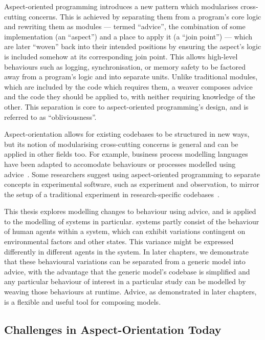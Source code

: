 Aspect-oriented programming introduces a new pattern which modularises
cross-cutting concerns. This is achieved by separating them from a program's
core logic and rewriting them as modules --- termed ``advice'', the combination
of some implementation (an ``aspect'') and a place to apply it (a ``join
point'') --- which are later ``woven'' back into their intended positions by
ensuring the aspect's logic is included somehow at its corresponding join point.
This allows high-level behaviours such as logging, synchronisation, or memory
safety to be factored away from a program's logic and into separate units.
Unlike traditional modules, which are included by the code which requires them,
a weaver composes advice and the code they should be applied to, with neither
requiring knowledge of the other. This separation is core to aspect-oriented
programming's design, and is referred to as ``obliviousness''.

Aspect-orientation allows for existing codebases to be structured in new ways,
but its notion of modularising cross-cutting concerns is general and can be
applied in other fields too. For example, business process modelling languages
have been adapted to accomodate behaviours or processes modelled using
advice~\cite{Cappelli_AOBPM,da2020implementation,charfi2007ao4bpel}. Some
researchers suggest using aspect-oriented programming to separate concepts in
experimental software, such as experiment and observation, to mirror the setup
of a traditional experiment in research-specific codebases~\cite{gulyas1999use}.

This thesis explores modelling changes to behaviour using advice, and is applied
to the modelling of \sociotechnical systems in particular. \Sociotechnical
systems partly consist of the behaviour of human agents within a system, which
can exhibit variations contingent on environmental factors and other states.
This variance might be expressed differently in different agents in the system.
In later chapters, we demonstrate that these behavioural variations can be
separated from a generic model into advice, with the advantage that the generic
model's codebase is simplified and any particular behaviour of interest in a
particular study can be modelled by weaving those behaviours at runtime. Advice,
as demonstrated in later chapters, is a flexible and useful tool for composing
models.


\subsection{Challenges in Aspect-Orientation Today}

